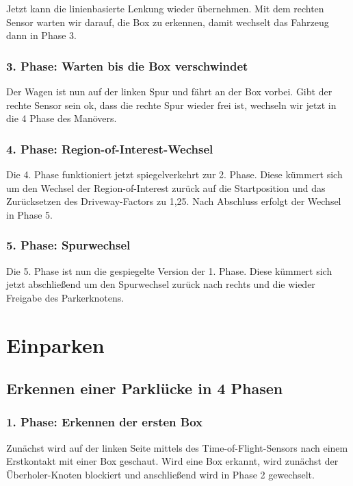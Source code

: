 Jetzt kann die linienbasierte Lenkung wieder übernehmen. Mit dem rechten Sensor warten wir darauf, die Box zu erkennen, damit wechselt das Fahrzeug dann in Phase 3.

\subsubsection{3. Phase: Warten bis die Box verschwindet}
Der Wagen ist nun auf der linken Spur und fährt an der Box vorbei. Gibt der rechte Sensor sein ok, dass die rechte Spur wieder frei ist, wechseln wir jetzt in die 4 Phase des Manövers.

\subsubsection{4. Phase: Region-of-Interest-Wechsel}
Die 4. Phase funktioniert jetzt spiegelverkehrt zur 2. Phase. Diese kümmert sich um den Wechsel der Region-of-Interest zurück auf die Startposition und das Zurücksetzen des Driveway-Factors zu 1,25. Nach Abschluss erfolgt der Wechsel in Phase 5.

\subsubsection{5. Phase: Spurwechsel}
Die 5. Phase ist nun die gespiegelte Version der 1. Phase. Diese kümmert sich jetzt abschließend um den Spurwechsel zurück nach rechts und die wieder Freigabe des Parkerknotens.



\section{Einparken}

\subsection{Erkennen einer Parklücke in 4 Phasen}

\subsubsection{1. Phase: Erkennen der ersten Box}
Zunächst wird auf der linken Seite mittels des Time-of-Flight-Sensors nach einem Erstkontakt mit einer Box geschaut. Wird eine Box erkannt, wird zunächst der Überholer-Knoten blockiert und anschließend wird in Phase 2 gewechselt.

